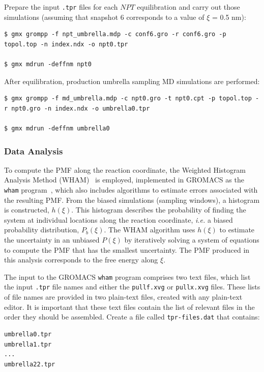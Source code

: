 \documentclass[9pt,tutorial,pubversion]{livecoms}
\begin{document}
Prepare the input \texttt{.tpr} files for each $NPT$ equilibration and carry out those simulations (assuming that snapshot 6 corresponds to a value of $\xi$ = 0.5 nm):

\begin{lstlisting}
$ gmx grompp -f npt_umbrella.mdp -c conf6.gro -r conf6.gro -p topol.top -n index.ndx -o npt0.tpr

$ gmx mdrun -deffnm npt0
\end{lstlisting}

After equilibration, production umbrella sampling MD simulations are performed:

\begin{lstlisting}
$ gmx grompp -f md_umbrella.mdp -c npt0.gro -t npt0.cpt -p topol.top -r npt0.gro -n index.ndx -o umbrella0.tpr

$ gmx mdrun -deffnm umbrella0
\end{lstlisting}

\subsubsection{Data Analysis} \label{umbrella_analysis}

To compute the PMF along the reaction coordinate, the Weighted Histogram Analysis Method (WHAM)~\cite{Kumar1992} is employed, implemented in GROMACS as the \texttt{wham} program~\cite{Hub2010}, which also includes algorithms to estimate errors associated with the resulting PMF. From the biased simulations (sampling windows), a histogram is constructed, $h(\xi)$. This histogram describes the probability of finding the system at individual locations along the reaction coordinate, {\em i.e.} a biased probability distribution, $P_b(\xi)$. The WHAM algorithm uses $h(\xi)$ to estimate the uncertainty in an unbiased $P(\xi)$ by iteratively solving a system of equations to compute the PMF that has the smallest uncertainty. The PMF produced in this analysis corresponds to the free energy along $\xi$.

The input to the GROMACS \texttt{wham} program comprises two text files, which list the input \texttt{.tpr} file names and either the \texttt{pullf.xvg} or \texttt{pullx.xvg} files. These lists of file names are provided in two plain-text files, created with any plain-text editor. It is important that these text files contain the list of relevant files in the order they should be assembled. Create a file called \texttt{tpr-files.dat} that contains:

\begin{lstlisting}
umbrella0.tpr
umbrella1.tpr
...
umbrella22.tpr
\end{lstlisting}
\end{document}
